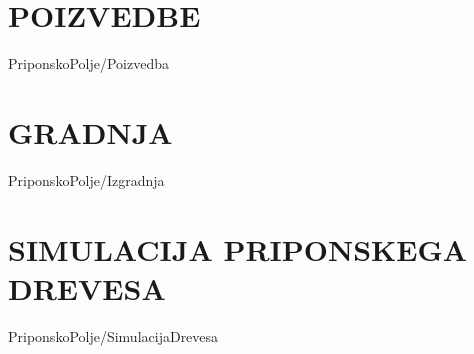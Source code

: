 
\section{POIZVEDBE}\label{sec:SAPoizvedbe}
{PriponskoPolje/Poizvedba}


\section{GRADNJA}\label{sec:SAIzgradnja}
{PriponskoPolje/Izgradnja}

\section{SIMULACIJA PRIPONSKEGA DREVESA}\label{sec:STsimulacija}
{PriponskoPolje/SimulacijaDrevesa}